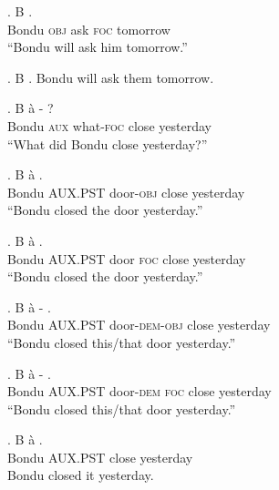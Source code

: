 \documentclass{assets/fieldnotes}
\begin{document}
\exg. B    .\\
Bondu \textsc{obj} ask \textsc{foc} tomorrow\\
``Bondu will ask him tomorrow.''\\

\ex. B    .
Bondu will ask them tomorrow.\\


\exg. B \`a -  ?\\
Bondu \textsc{aux} what-\textsc{foc} close yesterday\\
``What did Bondu close yesterday?''

\exg. B \`a   .\\
Bondu \textsc{AUX.PST} door-\textsc{obj} close yesterday\\
``Bondu closed the door yesterday.''

\exg. B \`a    .\\
Bondu \textsc{AUX.PST} door \textsc{foc} close yesterday\\
``Bondu closed the door yesterday.''

\exg. B \`a -  .\\
Bondu \textsc{AUX.PST} door-\textsc{dem-obj} close yesterday\\
``Bondu closed this/that door yesterday.''

\exg. B \`a -   .\\
Bondu \textsc{AUX.PST} door-\textsc{dem} \textsc{foc} close yesterday\\
``Bondu closed this/that door yesterday.''



\exg. B \`a  .\\
Bondu \textsc{AUX.PST} close yesterday\\
Bondu closed it yesterday.\\
\end{document}

